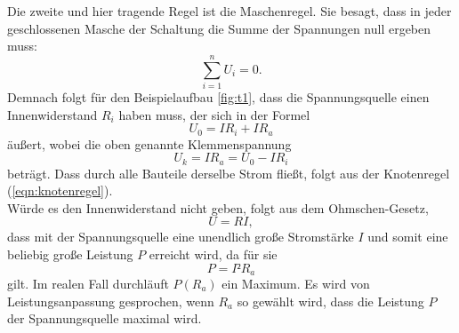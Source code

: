 Die zweite und hier tragende Regel ist die Maschenregel.
Sie besagt, dass in jeder geschlossenen Masche der Schaltung die Summe der Spannungen null ergeben muss:
\begin{equation}
  \sum_{i=1}^n U_i = 0.
  \label{eqn:maschenregel}
\end{equation}
Demnach folgt für den Beispielaufbau \ref{fig:t1}, dass die Spannungsquelle einen Innenwiderstand $R_i$ haben muss, der sich in der Formel
\begin{equation}
  U_0 = IR_i + IR_a
\end{equation}
äußert, wobei die oben genannte Klemmenspannung
\begin{equation}
  U_k = IR_a = U_0 - IR_i
  \label{eqn:klemmspannung}
\end{equation}
beträgt.
Dass durch alle Bauteile derselbe Strom fließt, folgt aus der Knotenregel (\ref{eqn:knotenregel}).\\
Würde es den Innenwiderstand nicht geben, folgt aus dem Ohmschen-Gesetz,
\begin{equation}
  U = RI,
\end{equation}
dass mit der Spannungsquelle eine unendlich große Stromstärke $I$ und somit eine beliebig große Leistung $P$ erreicht wird, da für sie
\begin{equation}
  P = I²R_a
  \label{eqn:leistung}
\end{equation}
gilt.
Im realen Fall durchläuft $P(R_a)$ ein Maximum.
Es wird von Leistungsanpassung gesprochen, wenn $R_a$ so gewählt wird, dass die Leistung $P$ der Spannungsquelle maximal wird.
